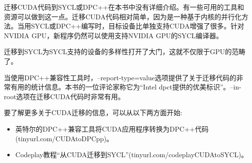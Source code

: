 迁移CUDA代码到SYCL或DPC++在本书中没有详细介绍。有一些可用的工具和资源可以做到这一点。迁移CUDA代码相对简单，因为是一种基于内核的并行化方法。当用SYCL或DPC++编写时，目标设备比单独支持CUDA增强了很多。针对NVIDIA GPU，新程序仍然可以使用支持NVIDIA GPU的SYCL编译器。\par

迁移到SYCL为SYCL支持的设备的多样性打开了大门，这就不仅限于GPU的范畴了。\par

当使用DPC++兼容性工具时，--report-type=value选项提供了关于迁移代码的非常有用的统计信息。本书的一位评论家称它为“Intel dpct提供的优美标识”。--in-root选项在迁移CUDA代码时非常有用。\par

要了解更多关于CUDA迁移的信息，可以从以下两方面开始:\par

\begin{itemize}
	\item 英特尔的DPC++兼容工具将CUDA应用程序转换为DPC++代码(tinyurl.com/CUDAtoDPCpp)。
	\item Codeplay教程“从CUDA迁移到SYCL”(tinyurl.com/codeplayCUDAtoSYCL)。
\end{itemize}
















